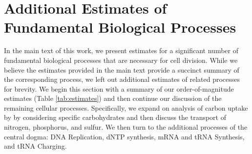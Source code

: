 \section{Additional Estimates of Fundamental Biological Processes}
\label{sec:SI_nutr_trans}

In the main text of this work, we present estimates for a significant number of
fundamental biological processes that are necessary for cell division. While we
believe the estimates provided in the main text provide a succinct summary of
the corresponding process, we left out additional estimates of related processes
for brevity. We begin this section with a summary of our order-of-magnitude
estimates (Table \ref{tab:estimates}) and then continue our discussion of the
remaining cellular processes. Specifically, we expand on analysis of carbon
uptake by by considering specific carbohydrates and then discuss the transport
of nitrogen, phosphorus, and  sulfur. We then turn to the additional processes
of the central dogma: DNA Replication, dNTP synthesis,  mRNA and tRNA Synthesis,
and tRNA Charging.

